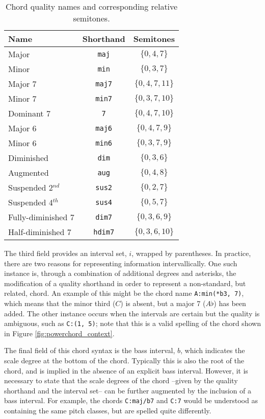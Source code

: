 \begin{table}[h]
\begin{center}
\caption{Chord quality names and corresponding relative semitones.}
\begin{tabular}{l | c | c}
Name & Shorthand & Semitones \\
\hline
Major & \texttt{maj} & $\{0, 4, 7\}$ \\
Minor & \texttt{min} & $\{0, 3, 7\}$ \\
Major 7 & \texttt{maj7} & $\{0, 4, 7, 11\}$ \\
Minor 7 & \texttt{min7} & $\{0, 3, 7, 10\}$ \\
Dominant 7 & \texttt{7} & $\{0, 4, 7, 10\}$ \\
Major 6 & \texttt{maj6} & $\{0, 4, 7, 9\}$ \\
Minor 6 & \texttt{min6} & $\{0, 3, 7, 9\}$ \\
Diminished & \texttt{dim} & $\{0, 3, 6\}$ \\
Augmented & \texttt{aug} & $\{0, 4, 8\}$ \\
Suspended 2$^{nd}$ & \texttt{sus2} & $\{0, 2, 7\}$ \\
Suspended 4$^{th}$ & \texttt{sus4} & $\{0, 5, 7\}$ \\
Fully-diminished 7 & \texttt{dim7} & $\{0, 3, 6, 9\}$ \\
Half-diminished 7 & \texttt{hdim7} & $\{0, 3, 6, 10\}$ \\
\hline
\end{tabular}
\label{tab:qualities}
\end{center}
\end{table}


The third field provides an interval set, $i$, wrapped by parentheses.
In practice, there are two reasons for representing information intervallically.
One such instance is, through a combination of additional degrees and asterisks, the modification of a quality shorthand in order to represent a non-standard, but related, chord.
An example of this might be the chord name \texttt{A:min(*b3, 7)}, which means that the minor third ($C$) is absent, but a major 7 ($A\flat$) has been added.
The other instance occurs when the intervals are certain but the quality is ambiguous, such as \texttt{C:(1, 5)}; note that this is a valid spelling of the chord shown in Figure \ref{fig:powerchord_context}.

The final field of this chord syntax is the bass interval, $b$, which indicates the scale degree at the bottom of the chord.
Typically this is also the root of the chord, and is implied in the absence of an explicit bass interval.
However, it is necessary to state that the scale degrees of the chord --given by the quality shorthand and the interval set-- can be further augmented by the inclusion of a bass interval.
For example, the chords \texttt{C:maj/b7} and \texttt{C:7} would be understood as containing the same pitch classes, but are spelled quite differently.



